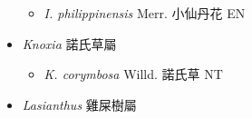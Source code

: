\begin{itemize}
  \begin{itemize}
        \item[] \textit{I. philippinensis} Merr.  小仙丹花   EN
  \end{itemize}
 \item[] \textit{Knoxia} 諾氏草屬
                                
  \begin{itemize}
        \item[] \textit{K. corymbosa} Willd.  諾氏草   NT
  \end{itemize}
 \item[] \textit{Lasianthus} 雞屎樹屬
                                

\end{itemize}

